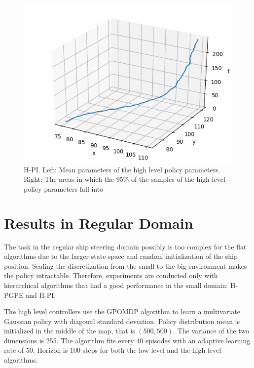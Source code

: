 \begin{figure}[t!]
	\centering
    \begin{minipage}{0.55\textwidth}
    	\includegraphics[width=\textwidth]{plots/small/H-PI-mu.png}
    \end{minipage}
    \begin{minipage}{0.44\textwidth}
    	\setlength\figureheight{5cm}  
		\setlength\figurewidth{5cm}
		
    \end{minipage}
    \caption[H-PI mean value and variance in small environment]{H-PI. Left: Mean parameters of the high level policy parameters. Right: The areas in which the $95\%$ of the samples of the high level policy parameters fall into}
    \label{fig:small_h_pi_mu_sigma}
    
\end{figure}

\clearpage

\section{Results in Regular Domain}

The task in the regular ship steering domain possibly is too complex for the flat algorithms due to the larger state-space and random initialization of the ship position. Scaling the discretization from the small to the big environment makes the policy intractable. Therefore, experiments are conducted only with hierarchical algorithms that had a good performance in the small domain: H-PGPE and H-PI. 

The high level controllers use the GPOMDP algorithm to learn a multivariate Gaussian policy with diagonal standard deviation. Policy distribution mean is initialized in the middle of the map, that is $(500, 500)$. The variance of the two dimensions is 255. The algorithm fits every 40 episodes with an adaptive learning rate of 50. Horizon is 100 steps for both the low level and the high level algorithms.

